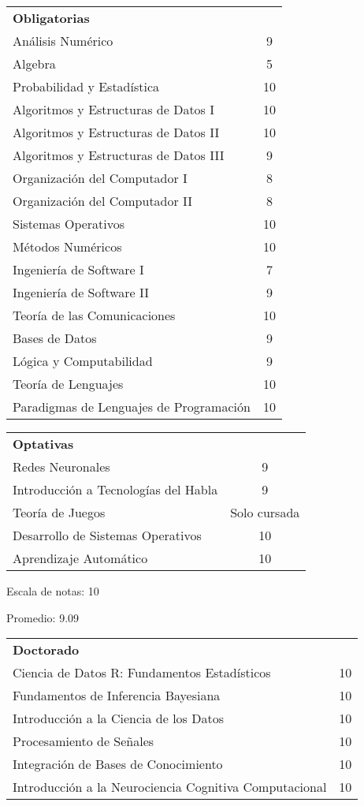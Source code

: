 \documentclass[a4paper,10pt]{article}
\begin{document}
\begin{tabular}{ l c }

\textbf{Obligatorias} \smallskip  & \\ 
Análisis Numérico & 9\\
Algebra & 5\\
Probabilidad y Estadística & 10\\
Algoritmos y Estructuras de Datos I & 10\\
Algoritmos y Estructuras de Datos II & 10\\
Algoritmos y Estructuras de Datos III & 9\\
Organización del Computador I & 8\\
Organización del Computador II & 8\\
Sistemas Operativos & 10\\
Métodos Numéricos & 10\\
Ingeniería de Software I & 7\\
Ingeniería de Software II & 9\\
Teoría de las Comunicaciones & 10\\
Bases de Datos & 9\\
Lógica y Computabilidad & 9\\
Teoría de Lenguajes & 10\\
Paradigmas de Lenguajes de Programación & 10\\
\end{tabular}

\medskip
\begin{tabular}{l c}
\textbf{Optativas} \smallskip & \\
Redes Neuronales & 9\\
Introducción a Tecnologías del Habla & 9\\
Teoría de Juegos & Solo cursada\\
Desarrollo de Sistemas Operativos & 10\\
Aprendizaje Automático & 10\\
\end{tabular}
\bigskip

Escala de notas: 10

Promedio: 9.09

\bigskip
\begin{tabular}{l c}
\textbf{Doctorado} \smallskip & \\
Ciencia de Datos R: Fundamentos Estadísticos & 10 \\
Fundamentos de Inferencia Bayesiana & 10 \\
Introducción a la Ciencia de los Datos & 10 \\ 
Procesamiento de Señales & 10 \\
Integración de Bases de Conocimiento & 10 \\
Introducción a la Neurociencia Cognitiva Computacional & 10 \\
\end{tabular}
\end{document}
